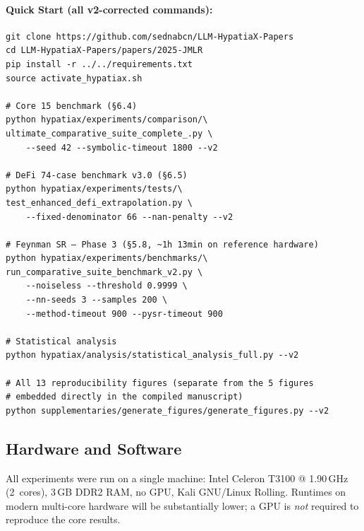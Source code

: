 \documentclass[twoside,11pt]{article}
\begin{document}
\paragraph{Quick Start (all v2-corrected commands):}
\begin{small}
\begin{verbatim}
git clone https://github.com/sednabcn/LLM-HypatiaX-Papers
cd LLM-HypatiaX-Papers/papers/2025-JMLR
pip install -r ../../requirements.txt
source activate_hypatiax.sh

# Core 15 benchmark (§6.4)
python hypatiax/experiments/comparison/\
ultimate_comparative_suite_complete_.py \
    --seed 42 --symbolic-timeout 1800 --v2

# DeFi 74-case benchmark v3.0 (§6.5)
python hypatiax/experiments/tests/\
test_enhanced_defi_extrapolation.py \
    --fixed-denominator 66 --nan-penalty --v2

# Feynman SR — Phase 3 (§5.8, ~1h 13min on reference hardware)
python hypatiax/experiments/benchmarks/\
run_comparative_suite_benchmark_v2.py \
    --noiseless --threshold 0.9999 \
    --nn-seeds 3 --samples 200 \
    --method-timeout 900 --pysr-timeout 900

# Statistical analysis
python hypatiax/analysis/statistical_analysis_full.py --v2

# All 13 reproducibility figures (separate from the 5 figures
# embedded directly in the compiled manuscript)
python supplementaries/generate_figures/generate_figures.py --v2
\end{verbatim}
\end{small}

\subsection{Hardware and Software}

All experiments were run on a single machine: Intel Celeron T3100 @
1.90\,GHz (2~cores), 3\,GB DDR2 RAM, no GPU, Kali GNU/Linux Rolling.
Runtimes on modern multi-core hardware will be substantially lower; a GPU
is \emph{not} required to reproduce the core results.
\end{document}
